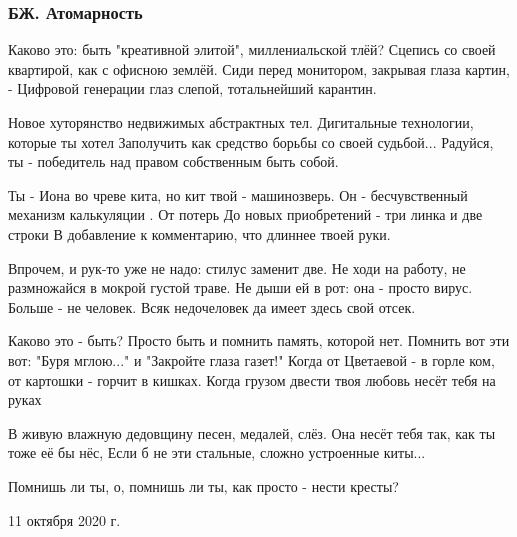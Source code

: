 
 
 

\subsubsection{БЖ. Атомарность}

Каково это: быть "креативной элитой", миллениальской тлёй?
Сцепись со своей квартирой, как с офисною землёй.
Сиди перед монитором, закрывая глаза картин, -
Цифровой генерации глаз слепой, тотальнейший карантин.

Новое хуторянство недвижимых абстрактных тел.
Дигитальные технологии, которые ты хотел
Заполучить как средство борьбы со своей судьбой...
Радуйся, ты - победитель над правом собственным быть собой.

Ты - Иона во чреве кита, но кит твой - машинозверь.
Он - бесчувственный механизм калькуляции . От потерь
До новых приобретений - три линка и две строки
В добавление к комментарию, что длиннее твоей руки.

Впрочем, и рук-то уже не надо: стилус заменит две.
Не ходи на работу, не размножайся в мокрой густой траве.
Не дыши ей в рот: она - просто вирус. Больше - не человек.
Всяк недочеловек да имеет здесь свой отсек.

Каково это - быть? Просто быть и помнить память, которой нет.
Помнить вот эти вот: "Буря мглою..." и "Закройте глаза газет!"
Когда от Цветаевой - в горле ком, от картошки - горчит в кишках.
Когда грузом двести твоя любовь несёт тебя на руках

В живую влажную дедовщину песен, медалей, слёз.
Она несёт тебя так, как ты тоже её бы нёс,
Если б не эти стальные, сложно устроенные киты...

Помнишь ли ты, о, помнишь ли ты, как просто - нести кресты?

11 октября 2020 г.
